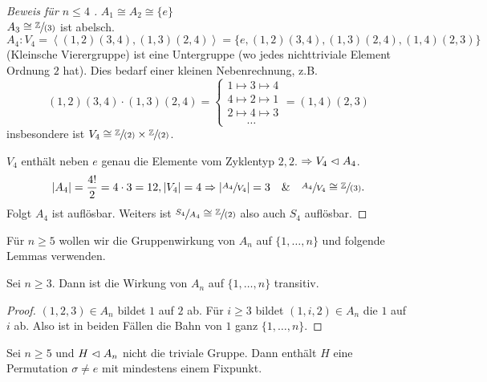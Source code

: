 \begin{proof}[Beweis für $n \leq 4$ ]
	$A_1 \cong A_2 \cong \{e\}$\\
	$A_3 \cong \sfrac{\mathbb{Z}}{(3)}$ ist abelsch.\\
	$A_{4}: V_4 = \left< (1,2) (3,4), (1,3)(2,4) \right> = \{e, (1,2)(3,4), (1,3)(2,4), (1,4)(2,3)\} $ (Kleinsche Vierergruppe) 
	ist eine Untergruppe (wo jedes nichttriviale Element Ordnung $2$ hat).
	Dies bedarf einer kleinen Nebenrechnung,  z.B.
	\[
		(1,2)(3,4) \cdot (1,3)(2,4) = \begin{cases}
			1  \mapsto 3 \mapsto 4\\
			4 \mapsto 2 \mapsto 1\\
			2 \mapsto 4 \mapsto 3\\
			\quad\;\;\,\ldots
		\end{cases} = (1,4) (2,3)
	\] 
	insbesondere ist $V_4 \cong \sfrac{\mathbb{Z}}{(2)} \times \sfrac{\mathbb{Z}}{(2)}$.

	$V_4$ enthält neben $e$ genau die Elemente vom Zyklentyp $2,2$. $\Rightarrow V_4 \vartriangleleft A_4$.
	\[
		\abs{A_4} = \frac{4!}{2} = 4 \cdot 3 = 12, \abs{V_4} = 4 \Rightarrow \abs{\sfrac{A_4}{V_4}} = 3 \quad \& \quad \sfrac{A_4}{V_4} \cong \sfrac{\mathbb{Z}}{(3)}
	.\]
	Folgt $A_4$ ist auflösbar. Weiters ist $\sfrac{S_4}{A_4} \cong \sfrac{\mathbb{Z}}{(2)}$ also auch $S_4$ auflösbar.
\end{proof}

Für $n \geq 5$ wollen wir die Gruppenwirkung von $A_{n}$ auf $\{1,\ldots,n\}$ und folgende Lemmas verwenden.

\begin{lemma}
	Sei $n \geq 3$. Dann ist die Wirkung von $A_{n}$ auf $\{1,\ldots,n\} $ transitiv.
\end{lemma}

\begin{proof}
	$(1,2,3) \in A_{n}$ bildet $1$ auf $2$ ab. Für $i \geq 3$ bildet $(1,i,2) \in A_{n}$ die $1$ auf $i$ ab.
	Also ist in beiden Fällen die Bahn von $1$ ganz $\{1,\ldots,n\}$.
\end{proof}

\begin{lemma}
	Sei $n \geq 5$ und $H \vartriangleleft A_{n}$ nicht die triviale Gruppe. Dann enthält $H$ eine Permutation $\sigma \neq e$ mit mindestens einem Fixpunkt.
\end{lemma}

